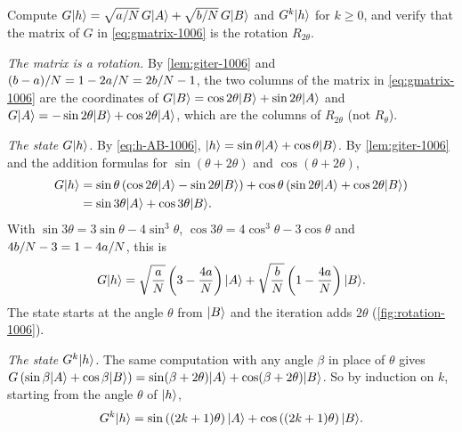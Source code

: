 \begin{exercisebox}
\begin{exercise}\label{ex:grover-rotation-1006}
    Compute $G\lvert h \rangle = \sqrt{a/N}\, G\lvert A \rangle + \sqrt{b/N}\, G\lvert B \rangle$ and
    $G^k\lvert h \rangle$ for $k \geq 0$, and verify that the matrix of $G$ in \cref{eq:gmatrix-1006} is the
    rotation $R_{2\theta}$.
\end{exercise}
\tcblower
\begin{wsolution}
    \emph{The matrix is a rotation.} By \cref{lem:giter-1006} and $(b-a)/N = 1 - 2a/N = 2b/N - 1$,
    the two columns of the matrix in \cref{eq:gmatrix-1006} are the coordinates of
    $G\lvert B \rangle = \cos 2\theta \lvert B \rangle + \sin 2\theta \lvert A \rangle$ and $G\lvert A \rangle = -\sin 2\theta \lvert B \rangle + \cos 2\theta \lvert A \rangle$,
    which are the columns of $R_{2\theta}$ (not $R_\theta$).

    \emph{The state $G\lvert h \rangle$.} By \cref{eq:h-AB-1006}, $\lvert h \rangle = \sin\theta \lvert A \rangle + \cos\theta \lvert B \rangle$.
    By \cref{lem:giter-1006} and the addition formulas for $\sin(\theta + 2\theta)$ and
    $\cos(\theta + 2\theta)$,
    \begin{align*}
        G\lvert h \rangle
         & = \sin\theta \left(\cos 2\theta \lvert A \rangle - \sin 2\theta \lvert B \rangle\right) + \cos\theta \left(\sin 2\theta \lvert A \rangle + \cos 2\theta \lvert B \rangle\right) \\
         & = \sin 3\theta \lvert A \rangle + \cos 3\theta \lvert B \rangle.
    \end{align*}
    With $\sin 3\theta = 3\sin\theta - 4\sin^3\theta$, $\cos 3\theta = 4\cos^3\theta - 3\cos\theta$ and
    $4b/N - 3 = 1 - 4a/N$, this is
    \[G\lvert h \rangle = \sqrt{\frac{a}{N}}\left(3 - \frac{4a}{N}\right)\lvert A \rangle + \sqrt{\frac{b}{N}}\left(1 - \frac{4a}{N}\right)\lvert B \rangle.\]
    The state starts at the angle $\theta$ from $\lvert B \rangle$ and the iteration adds $2\theta$
    (\cref{fig:rotation-1006}).

    \emph{The state $G^k\lvert h \rangle$.} The same computation with any angle $\beta$ in place of $\theta$ gives
    $G\left(\sin\beta \lvert A \rangle + \cos\beta \lvert B \rangle\right) = \sin(\beta + 2\theta) \lvert A \rangle + \cos(\beta + 2\theta) \lvert B \rangle$.
    So by induction on $k$, starting from the angle $\theta$ of $\lvert h \rangle$,
    \[G^k\lvert h \rangle = \sin\left((2k+1)\theta\right) \lvert A \rangle + \cos\left((2k+1)\theta\right) \lvert B \rangle.\]
\end{wsolution}
\end{exercisebox}

